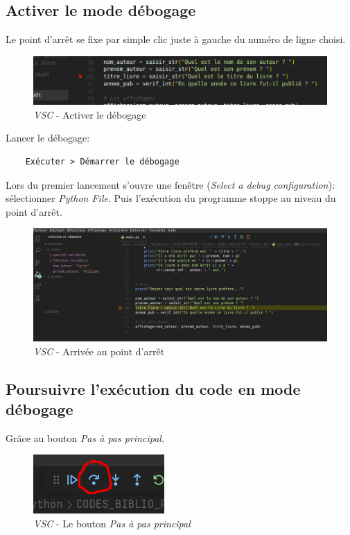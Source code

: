 \documentclass[a4paper,12pt]{book}
\begin{document}
\subsection*{Activer le mode débogage}
Le point d'arrêt se fixe par simple clic juste à gauche du numéro de ligne choisi.
\begin{figure}[h]
\begin{center}
\includegraphics[scale=0.3]{IMG/VSC-01.png}
\caption{\textit{VSC} - Activer le débogage}
\end{center}
\end{figure}
\medskip

Lancer le débogage:
\begin{verbatim}
    Exécuter > Démarrer le débogage
\end{verbatim}
\medskip

Lors du premier lancement s'ouvre une fenêtre (\textit{Select a debug configuration}): sélectionner \textit{Python File}. Puis l'exécution du programme stoppe au niveau du point d'arrêt.
\begin{figure}[h]
\begin{center}
\includegraphics[scale=0.3]{IMG/VSC-02.png}
\caption{\textit{VSC} - Arrivée au point d'arrêt}
\end{center}
\end{figure}
\medskip

\subsection*{Poursuivre l'exécution du code en mode débogage}
Grâce au bouton \textit{Pas à pas principal}.
\begin{figure}[h]
\begin{center}
\includegraphics[scale=0.6]{IMG/VSC-03.png}
\caption{\textit{VSC} - Le bouton \textit{Pas à pas principal}}
\end{center}
\end{figure}
\medskip
\end{document}
